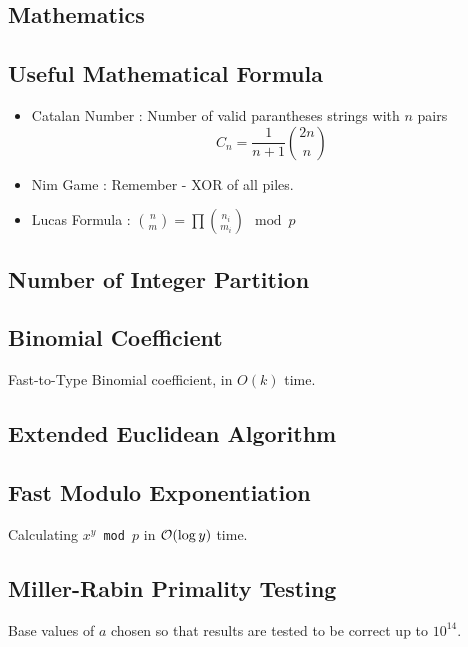 \documentclass[landscape,8pt]{article}
\begin{document}
\begin{multicols}{2}
\section{Mathematics}
  \subsection{Useful Mathematical Formula}
    \begin{itemize}
      \item Catalan Number : Number of valid parantheses strings with $n$ pairs
      \[
        C_n = \frac{1}{n+1}\binom{2n}{n}
      \]
      \item Nim Game : Remember - XOR of all piles.
      \item Lucas Formula : $\binom{n}{m} = \prod \binom{n_i}{m_i} \mod p$
    \end{itemize}
  \subsection{Number of Integer Partition}
    

  \subsection{Binomial Coefficient}
    Fast-to-Type Binomial coefficient, in $O(k)$ time.
    

  \subsection{Extended Euclidean Algorithm}
    

  \subsection{Fast Modulo Exponentiation}
  Calculating \texttt{$x^y$ mod $p$} in $\order{\log y}$ time.
    

  \subsection{Miller-Rabin Primality Testing}
  Base values of $a$ chosen so that results are tested to be correct up to $10^{14}$.
    


\end{multicols}
\end{document}
